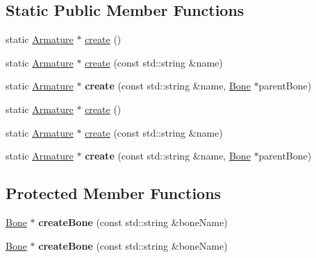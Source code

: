 \subsection*{Static Public Member Functions}
\begin{DoxyCompactItemize}
\item 
static \hyperlink{classcocostudio_1_1Armature}{Armature} $\ast$ \hyperlink{classcocostudio_1_1Armature_aa6c6116e301706938905b26b27a33de9}{create} ()
\item 
static \hyperlink{classcocostudio_1_1Armature}{Armature} $\ast$ \hyperlink{classcocostudio_1_1Armature_a0d1589fd9a1cb8bd33792ed7acfbcfd1}{create} (const std\+::string \&name)
\item 
\mbox{\label{classcocostudio_1_1Armature_a9fcdb6f45d166e77af00584bfaa35c07}} 
static \hyperlink{classcocostudio_1_1Armature}{Armature} $\ast$ {\bfseries create} (const std\+::string \&name, \hyperlink{classcocostudio_1_1Bone}{Bone} $\ast$parent\+Bone)
\item 
static \hyperlink{classcocostudio_1_1Armature}{Armature} $\ast$ \hyperlink{classcocostudio_1_1Armature_ab6588941f349230af3314e190fe6eb83}{create} ()
\item 
static \hyperlink{classcocostudio_1_1Armature}{Armature} $\ast$ \hyperlink{classcocostudio_1_1Armature_a9f461aaafb80e01a6760af5101197702}{create} (const std\+::string \&name)
\item 
\mbox{\label{classcocostudio_1_1Armature_ae21801e6d8dd42203882d90a91a57173}} 
static \hyperlink{classcocostudio_1_1Armature}{Armature} $\ast$ {\bfseries create} (const std\+::string \&name, \hyperlink{classcocostudio_1_1Bone}{Bone} $\ast$parent\+Bone)
\end{DoxyCompactItemize}
\subsection*{Protected Member Functions}
\begin{DoxyCompactItemize}
\item 
\mbox{\label{classcocostudio_1_1Armature_a6f3453ae9d2fce4900ab7679886c1cf6}} 
\hyperlink{classcocostudio_1_1Bone}{Bone} $\ast$ {\bfseries create\+Bone} (const std\+::string \&bone\+Name)
\item 
\mbox{\label{classcocostudio_1_1Armature_a27cdebc0824aaddc8363a37036cc22af}} 
\hyperlink{classcocostudio_1_1Bone}{Bone} $\ast$ {\bfseries create\+Bone} (const std\+::string \&bone\+Name)
\end{DoxyCompactItemize}
